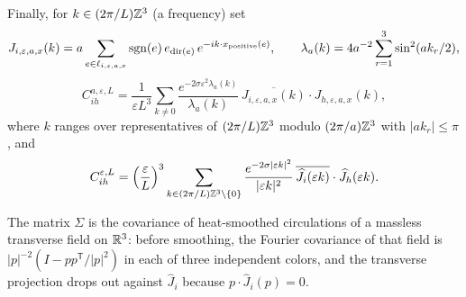 \begin{definition}
Finally, for $k\in(2\pi/L)\mathbb Z^3$ (a frequency) set
\[
 J_{i,\varepsilon,a,x}(k)=a\sum_{e\in\ell_{i,\varepsilon,a,x}}\operatorname{sgn}(e)\,e_{\operatorname{dir}(e)}\,e^{-ik\cdot x_{\rm positive}(e)},\qquad
 \lambda_a(k)=4a^{-2}\sum_{r=1}^3\sin^2(ak_r/2),
\]
\[
 C^{a,\varepsilon,L}_{ih}=\frac1{\varepsilon L^3}\sum_{k\ne0}\frac{e^{-2\sigma\varepsilon^2\lambda_a(k)}}{\lambda_a(k)}\,\overline{J_{i,\varepsilon,a,x}(k)}\cdot J_{h,\varepsilon,a,x}(k),
\]
where $k$ ranges over representatives of $(2\pi/L)\mathbb Z^3$ modulo $(2\pi/a)\mathbb Z^3$ with $|ak_r|\le\pi$, and
\[
 C^{\varepsilon,L}_{ih}=\Bigl(\frac\varepsilon L\Bigr)^3\sum_{k\in(2\pi/L)\mathbb Z^3\setminus\{0\}}\frac{e^{-2\sigma|\varepsilon k|^2}}{|\varepsilon k|^2}\,\overline{\widehat J_i(\varepsilon k)}\cdot\widehat J_h(\varepsilon k).
\]
\end{definition}

The matrix $\Sigma$ is the covariance of heat-smoothed circulations of a massless transverse field on $\mathbb R^3$: before smoothing, the Fourier covariance of that field is $|p|^{-2}(I-pp^{\mathsf T}/|p|^2)$ in each of three independent colors, and the transverse projection drops out against $\widehat J_i$ because $p\cdot\widehat J_i(p)=0$.


